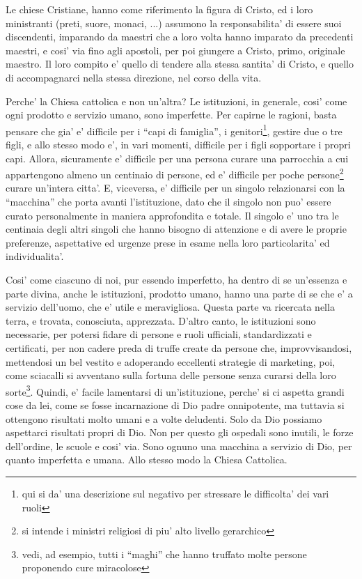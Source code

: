 Le chiese Cristiane, hanno come riferimento la figura di Cristo, ed i loro ministranti (preti, suore, monaci, ...) assumono la responsabilita' di essere suoi discendenti, imparando da maestri che a loro volta hanno imparato da precedenti maestri, e cosi' via fino agli apostoli, per poi giungere a Cristo, primo, originale maestro. Il loro compito e' quello di tendere alla stessa santita' di Cristo, e quello di accompagnarci nella stessa direzione, nel corso della vita.

Perche' la Chiesa cattolica e non un'altra? Le istituzioni, in generale, cosi' come ogni prodotto e servizio umano, sono imperfette. Per capirne le ragioni, basta pensare che gia' e' difficile per i ``capi di famiglia'', i genitori\footnote{qui si da' una descrizione sul negativo per stressare le difficolta' dei vari ruoli}, gestire due o tre figli, e allo stesso modo e', in vari momenti, difficile per i figli sopportare i propri capi. 
Allora, sicuramente e' difficile per una persona curare una parrocchia a cui appartengono almeno un centinaio di persone, ed e' difficile per poche persone\footnote{si intende i ministri religiosi di piu' alto livello gerarchico} curare un'intera citta'. E, viceversa, e' difficile per un singolo relazionarsi con la ``macchina'' che porta avanti l'istituzione, dato che il singolo non puo' essere curato personalmente in maniera approfondita e totale. Il singolo e' uno tra le centinaia degli altri singoli che hanno bisogno di attenzione e di avere le proprie preferenze, aspettative ed urgenze prese in esame nella loro particolarita' ed individualita'.

Cosi' come ciascuno di noi, pur essendo imperfetto, ha dentro di se un'essenza e parte divina, anche le istituzioni, prodotto umano, hanno una parte di se che e' a servizio dell'uomo, che e' utile e meravigliosa. Questa parte va ricercata nella terra, e trovata, conosciuta, apprezzata. 
D'altro canto, le istituzioni sono necessarie, per potersi fidare di persone e ruoli ufficiali, standardizzati e certificati, per non cadere preda di truffe create da persone che, improvvisandosi, mettendosi un bel vestito e adoperando eccellenti strategie di marketing, poi, come sciacalli si avventano sulla fortuna delle persone senza curarsi della loro sorte\footnote{vedi, ad esempio, tutti i ``maghi'' che hanno truffato molte persone proponendo cure miracolose}.
Quindi, e' facile lamentarsi di un'istituzione, perche' si ci aspetta grandi cose da lei, come se fosse incarnazione di Dio padre onnipotente, ma tuttavia si ottengono risultati molto umani e a volte deludenti. 
Solo da Dio possiamo aspettarci risultati propri di Dio.
Non per questo gli ospedali sono inutili, le forze dell'ordine, le scuole e cosi' via. Sono ognuno una macchina a servizio di Dio, per quanto imperfetta e umana. Allo stesso modo la Chiesa Cattolica.

